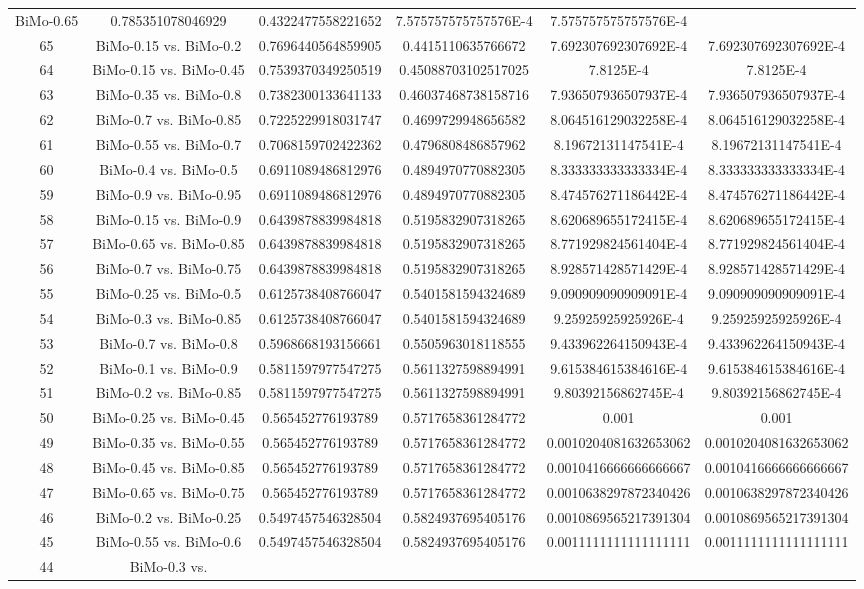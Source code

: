 \documentclass[a4paper,10pt]{article}
\begin{document}
\begin{landscape}
\begin{table}[!htp]
\begin{tabular}{cccccc}
BiMo-0.65&0.785351078046929&0.4322477558221652&7.575757575757576E-4&7.575757575757576E-4\\65&BiMo-0.15 vs. BiMo-0.2&0.7696440564859905&0.4415110635766672&7.692307692307692E-4&7.692307692307692E-4\\64&BiMo-0.15 vs. BiMo-0.45&0.7539370349250519&0.45088703102517025&7.8125E-4&7.8125E-4\\63&BiMo-0.35 vs. BiMo-0.8&0.7382300133641133&0.46037468738158716&7.936507936507937E-4&7.936507936507937E-4\\62&BiMo-0.7 vs. BiMo-0.85&0.7225229918031747&0.4699729948656582&8.064516129032258E-4&8.064516129032258E-4\\61&BiMo-0.55 vs. BiMo-0.7&0.7068159702422362&0.4796808486857962&8.19672131147541E-4&8.19672131147541E-4\\60&BiMo-0.4 vs. BiMo-0.5&0.6911089486812976&0.4894970770882305&8.333333333333334E-4&8.333333333333334E-4\\59&BiMo-0.9 vs. BiMo-0.95&0.6911089486812976&0.4894970770882305&8.474576271186442E-4&8.474576271186442E-4\\58&BiMo-0.15 vs. BiMo-0.9&0.6439878839984818&0.5195832907318265&8.620689655172415E-4&8.620689655172415E-4\\57&BiMo-0.65 vs. BiMo-0.85&0.6439878839984818&0.5195832907318265&8.771929824561404E-4&8.771929824561404E-4\\56&BiMo-0.7 vs. BiMo-0.75&0.6439878839984818&0.5195832907318265&8.928571428571429E-4&8.928571428571429E-4\\55&BiMo-0.25 vs. BiMo-0.5&0.6125738408766047&0.5401581594324689&9.090909090909091E-4&9.090909090909091E-4\\54&BiMo-0.3 vs. BiMo-0.85&0.6125738408766047&0.5401581594324689&9.25925925925926E-4&9.25925925925926E-4\\53&BiMo-0.7 vs. BiMo-0.8&0.5968668193156661&0.5505963018118555&9.433962264150943E-4&9.433962264150943E-4\\52&BiMo-0.1 vs. BiMo-0.9&0.5811597977547275&0.5611327598894991&9.615384615384616E-4&9.615384615384616E-4\\51&BiMo-0.2 vs. BiMo-0.85&0.5811597977547275&0.5611327598894991&9.80392156862745E-4&9.80392156862745E-4\\50&BiMo-0.25 vs. BiMo-0.45&0.565452776193789&0.5717658361284772&0.001&0.001\\49&BiMo-0.35 vs. BiMo-0.55&0.565452776193789&0.5717658361284772&0.0010204081632653062&0.0010204081632653062\\48&BiMo-0.45 vs. BiMo-0.85&0.565452776193789&0.5717658361284772&0.0010416666666666667&0.0010416666666666667\\47&BiMo-0.65 vs. BiMo-0.75&0.565452776193789&0.5717658361284772&0.0010638297872340426&0.0010638297872340426\\46&BiMo-0.2 vs. BiMo-0.25&0.5497457546328504&0.5824937695405176&0.0010869565217391304&0.0010869565217391304\\45&BiMo-0.55 vs. BiMo-0.6&0.5497457546328504&0.5824937695405176&0.0011111111111111111&0.0011111111111111111\\44&BiMo-0.3 vs. 
\end{tabular}
\end{table}
\end{landscape}
\end{document}
